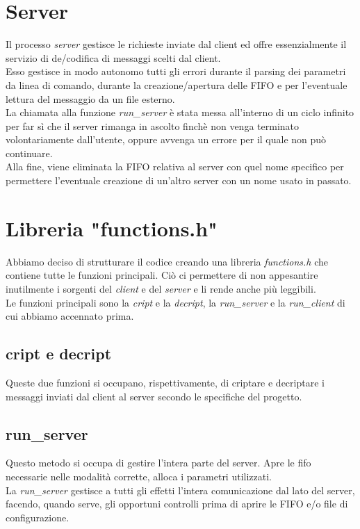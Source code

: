 \documentclass[a4paper,9pt]{article}
\begin{document}
\section{Server}
Il processo \emph{server} gestisce le richieste inviate dal client ed offre essenzialmente il servizio di de/codifica di messaggi scelti dal client.\\
Esso gestisce in modo autonomo tutti gli errori durante il parsing dei parametri da linea di comando, durante la creazione/apertura delle FIFO e per l'eventuale lettura del messaggio da un file esterno.\\
La chiamata alla funzione \emph{run\_server} è stata messa all'interno di un ciclo infinito per far sì che il server rimanga in ascolto finchè non venga terminato volontariamente dall'utente, oppure avvenga un errore per il quale non può continuare.\\
Alla fine, viene eliminata la FIFO relativa al server con quel nome specifico per permettere l'eventuale creazione di un'altro server con un nome usato in passato.

\section{Libreria "functions.h"}
Abbiamo deciso di strutturare il codice creando una libreria \emph{functions.h} che contiene tutte le funzioni principali. Ciò ci permettere di non appesantire inutilmente i sorgenti del \emph{client} e del \emph{server} e li rende anche più leggibili.\\
Le funzioni principali sono la \emph{cript} e la \emph{decript}, la \emph{run\_server} e la \emph{run\_client} di cui abbiamo accennato prima.
\subsection{cript e decript}
Queste due funzioni si occupano, rispettivamente, di criptare e decriptare i messaggi inviati dal client al server secondo le specifiche del progetto.
\subsection{run\_server}
Questo metodo si occupa di gestire l'intera parte del server. Apre le fifo necessarie nelle modalità corrette, alloca i parametri utilizzati.\\ 
La \emph{run\_server} gestisce a tutti gli effetti l'intera comunicazione dal lato del server, facendo, quando serve, gli opportuni controlli prima di aprire le FIFO e/o file di configurazione.
\end{document}
